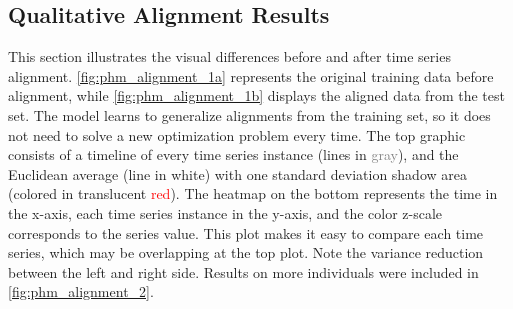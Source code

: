 \subsection{Qualitative Alignment Results}

This section illustrates the visual differences before and after time series alignment. \cref{fig:phm_alignment_1a} represents the original training data before alignment, while \cref{fig:phm_alignment_1b} displays the aligned data from the test set.
The model learns to generalize alignments from the training set, so it does not need to solve a new optimization problem every time. The top graphic consists of a timeline of every time series instance (lines in \textcolor{gray}{gray}), and the Euclidean average (line in white) with one standard deviation shadow area (colored in translucent \textcolor{red}{red}). The heatmap on the bottom represents the time in the x-axis, each time series instance in the y-axis, and the color z-scale corresponds to the series value. This plot makes it easy to compare each time series, which may be overlapping at the top plot. Note the variance reduction between the left and right side. Results on more individuals were included in \cref{fig:phm_alignment_2}.


